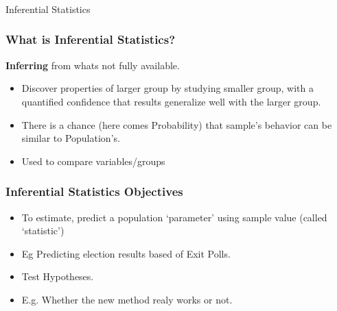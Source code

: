 \begin{frame}[fragile]\frametitle{}
\begin{center}
{\Large Inferential Statistics}
\end{center}
\end{frame}

\begin{frame}[fragile]\frametitle{What is Inferential Statistics?}
{\bf Inferring} from whats not fully available.
\begin{itemize}
\item Discover properties of larger group by studying smaller group, with a quantified confidence that results generalize well with the larger group.
\item There is a chance (here comes Probability) that sample's behavior can be similar to Population's.
\item Used to compare variables/groups
\end{itemize}
\end{frame}



\begin{frame}[fragile]\frametitle{Inferential Statistics Objectives}
\begin{itemize}
\item To estimate, predict a population `parameter' using sample value (called `statistic')
\item Eg Predicting election results based of Exit Polls.
\item Test Hypotheses. 
\item E.g. Whether the new method realy works or not.
\end{itemize}
\end{frame}

